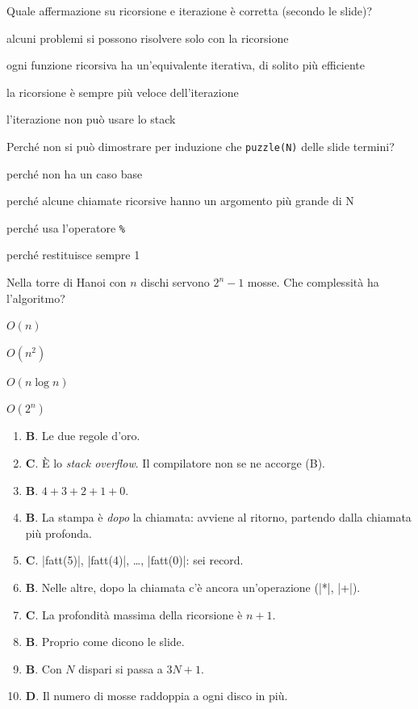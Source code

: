 \begin{quiz}{Quale affermazione su ricorsione e iterazione è corretta (secondo le slide)?}
  \item alcuni problemi si possono risolvere solo con la ricorsione
  \item ogni funzione ricorsiva ha un'equivalente iterativa, di solito più efficiente
  \item la ricorsione è sempre più veloce dell'iterazione
  \item l'iterazione non può usare lo stack
\end{quiz}

\begin{quiz}{Perché non si può dimostrare per induzione che \texttt{puzzle(N)} delle slide termini?}
  \item perché non ha un caso base
  \item perché alcune chiamate ricorsive hanno un argomento più grande di N
  \item perché usa l'operatore \texttt{\%}
  \item perché restituisce sempre 1
\end{quiz}

\begin{quiz}{Nella torre di Hanoi con $n$ dischi servono $2^n - 1$ mosse. Che complessità ha l'algoritmo?}
  \item $O(n)$
  \item $O(n^2)$
  \item $O(n \log n)$
  \item $O(2^n)$
\end{quiz}

\begin{soluzione}
\begin{enumerate}[label=\textbf{\arabic*.}]
  \item \textbf{B}. Le due regole d'oro.
  \item \textbf{C}. È lo \emph{stack overflow}. Il compilatore non se ne accorge (B).
  \item \textbf{B}. $4 + 3 + 2 + 1 + 0$.
  \item \textbf{B}. La stampa è \emph{dopo} la chiamata: avviene al ritorno, partendo
        dalla chiamata più profonda.
  \item \textbf{C}. \cc|fatt(5)|, \cc|fatt(4)|, \ldots, \cc|fatt(0)|: sei record.
  \item \textbf{B}. Nelle altre, dopo la chiamata c'è ancora un'operazione
        (\cc|*|, \cc|+|).
  \item \textbf{C}. La profondità massima della ricorsione è $n + 1$.
  \item \textbf{B}. Proprio come dicono le slide.
  \item \textbf{B}. Con $N$ dispari si passa a $3N + 1$.
  \item \textbf{D}. Il numero di mosse raddoppia a ogni disco in più.
\end{enumerate}
\end{soluzione}

